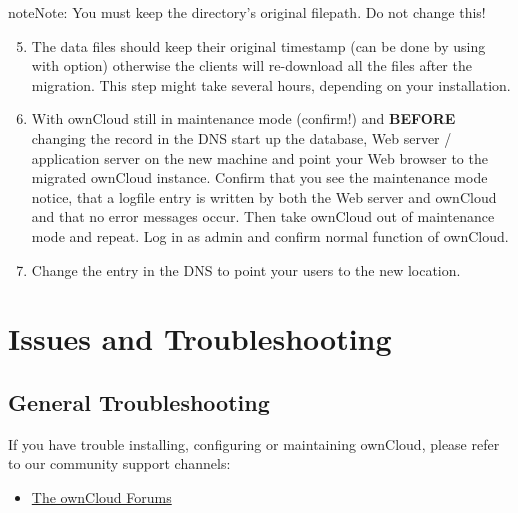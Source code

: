 \documentclass[letterpaper,10pt,english]{sphinxmanual}
\begin{document}
\begin{notice}{note}{Note:}
You must keep the  directory's original filepath. Do not change this!
\end{notice}
\begin{enumerate}
\setcounter{enumi}{4}
\item {} 
The data files should keep their original timestamp (can be done by using  with  option) otherwise the clients will re-download all the files after the migration. This step might take several hours, depending on your installation.

\item {} 
With ownCloud still in maintenance mode (confirm!) and \textbf{BEFORE} changing the  record in the DNS start up the database, Web server / application server on the new machine and point your Web browser to the migrated ownCloud instance. Confirm that you see the maintenance mode notice, that a logfile entry is written by both the Web server and ownCloud and that no error messages occur. Then take ownCloud out of maintenance mode and repeat. Log in as admin and confirm normal function of ownCloud.

\item {} 
Change the  entry in the DNS to point your users to the new
location.

\end{enumerate}


\chapter{Issues and Troubleshooting}
\label{issues/index::doc}\label{issues/index:issues-and-troubleshooting}

\section{General Troubleshooting}
\label{issues/general_troubleshooting:general-troubleshooting}\label{issues/general_troubleshooting::doc}
If you have trouble installing, configuring or maintaining ownCloud, please
refer to our community support channels:
\begin{itemize}
\item {} 
\href{https://central.owncloud.org}{The ownCloud Forums}

\end{itemize}
\end{document}
